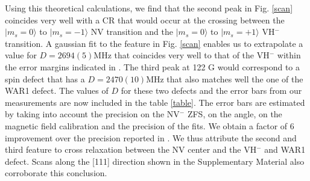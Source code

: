 \documentclass[9pt,twocolumn,twoside]{revtex4-1}
\begin{document}
Using this theoretical calculations, we find that the second peak in Fig. \ref{scan} coincides very well with a CR that would occur at the crossing between the $|m_s=0\rangle$ to $|m_s=-1\rangle$ NV transition and the $|m_s=0\rangle$ to $|m_s=+1\rangle$ VH$^-$ transition. 
A gaussian fit to the feature in Fig. \ref{scan} enables us to extrapolate a value for $D=2694(5)$MHz that coincides very well to that of the VH$^-$ within the error margins indicated in \citep{cruddace2007magnetic}.
The third peak at 122 G would correspond to a spin defect that has a $D=2470(10)$MHz that also matches well the one of the WAR1 defect. 
The values of $D$ for these two defects and the error bars from our measurements are now included in the table \ref{table}.
The error bars are estimated by taking into account the precision on the NV$^-$ ZFS, on the angle, on the magnetic field calibration and the precision of the fits. 
We obtain a factor of 6 improvement over the precision reported in \citep{cruddace2007magnetic}. We thus attribute the second and third feature to cross relaxation between the NV center and the VH$^-$ and WAR1 defect. Scans along the [111] direction shown in the Supplementary Material also corroborate this conclusion.
\end{document}
